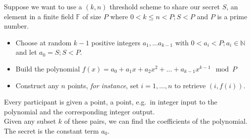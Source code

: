 \documentclass[preview,border=3mm]{article}
\begin{document}
\noindent
Suppose we want to use a $(k,n)$ threshold scheme to share our secret $S$, an
element in a finite field $\mathbb{F}$ of size $P$ where
$0 < k \leq n < P; S < P$ and $P$ is a prime number.

\begin{itemize}
    \item Choose at random $k-1$ positive integers $a_1, \ldots a_{k-1}$
        with $0 < a_i < P; a_i \in \mathbb{N}$ and let $a_0 = S; S < P$.
    \item Build the polynomial
        $f(x) = a_0 + a_1x + a_2x^2 + \ldots + a_{k-1}x^{k-1} \mod P$
    \item Construct any $n$ points, \emph{for instance}, set $i = 1, \ldots , n$
        to retrieve $(i, f(i))$.
\end{itemize}

\noindent
Every participant is given a point, a point, e.g.\ in integer input to the
polynomial and the corresponding integer output. \\

\noindent
Given any subset $k$ of these pairs, we can find the coefficients of the
polynomial. The secret is the constant term $a_0$.
\end{document}
